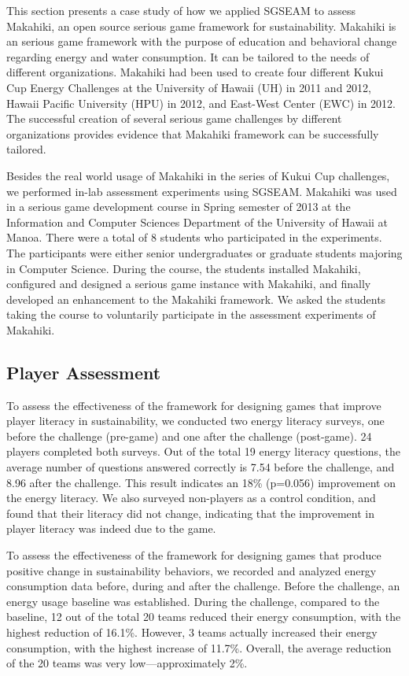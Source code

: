 \documentclass{sigchi}
\begin{document}
This section presents a case study of how we applied SGSEAM to assess Makahiki, an open source serious game framework for sustainability\cite{csdl2-12-06}. Makahiki is an serious
game framework with the purpose of education and behavioral change regarding energy and water consumption. It can be tailored to the needs of different organizations. Makahiki had been used to create four different Kukui Cup Energy Challenges at the University of Hawaii (UH) in 2011 and 2012, Hawaii Pacific University (HPU) in 2012, and East-West Center (EWC) in 2012. 
The successful creation of several serious game challenges by different organizations
provides evidence that Makahiki framework can be successfully tailored.

Besides the real world usage of Makahiki in the series of Kukui Cup challenges, we
performed in-lab assessment experiments using SGSEAM. Makahiki was used in a serious game
development course in Spring semester of 2013 at the Information and Computer Sciences
Department of the University of Hawaii at Manoa. There were a total of 8 students who
participated in the experiments.  The participants were either senior undergraduates or
graduate students majoring in Computer Science. During the course, the students installed
Makahiki, configured and designed a serious game instance with Makahiki, and finally
developed an enhancement to the Makahiki framework. We asked the students taking the
course to voluntarily participate in the assessment experiments of Makahiki.

\subsection{Player Assessment}

To assess the effectiveness of the framework for designing games that improve player literacy in sustainability, we
conducted two energy literacy surveys, one before the challenge (pre-game) and one after
the challenge (post-game). 24 players completed both surveys. Out of the total 19 energy
literacy questions, the average number of questions answered correctly is 7.54 before the
challenge, and 8.96 after the challenge. This result indicates an 18\% (p=0.056) improvement on the
energy literacy.  We also surveyed non-players as a control condition, and found that
their literacy did not change, indicating that the improvement in player literacy was
indeed due to the game. 

To assess the effectiveness of the framework for designing games that produce positive change in sustainability
behaviors, we recorded and analyzed energy consumption data before, during and after the
challenge.  Before the challenge, an energy usage baseline was established. During the
challenge, compared to the baseline, 12 out of the total 20 teams reduced their energy
consumption, with the highest reduction of 16.1\%. However, 3 teams actually increased
their energy consumption, with the highest increase of 11.7\%. Overall, the average
reduction of the 20 teams was very low---approximately 2\%.
\end{document}
